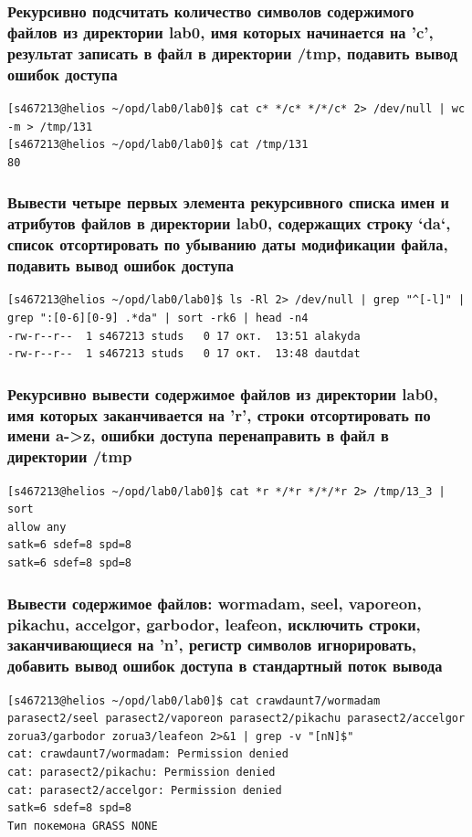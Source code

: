 \subsubsection*{Рекурсивно подсчитать количество символов содержимого файлов из директории lab0, имя которых начинается на 'c', результат записать в файл в директории /tmp, подавить вывод ошибок доступа}
\begin{verbatim}
[s467213@helios ~/opd/lab0/lab0]$ cat c* */c* */*/c* 2> /dev/null | wc -m > /tmp/131
[s467213@helios ~/opd/lab0/lab0]$ cat /tmp/131
80
\end{verbatim}


\subsubsection*{Вывести четыре первых элемента рекурсивного списка имен и атрибутов файлов в директории lab0, содержащих строку `da`, список отсортировать по убыванию даты модификации файла, подавить вывод ошибок доступа}
\begin{verbatim}
[s467213@helios ~/opd/lab0/lab0]$ ls -Rl 2> /dev/null | grep "^[-l]" | grep ":[0-6][0-9] .*da" | sort -rk6 | head -n4
-rw-r--r--  1 s467213 studs   0 17 окт.  13:51 alakyda
-rw-r--r--  1 s467213 studs   0 17 окт.  13:48 dautdat
\end{verbatim}

\subsubsection*{Рекурсивно вывести содержимое файлов из директории lab0, имя которых заканчивается на 'r', строки отсортировать по имени a->z, ошибки доступа перенаправить в файл в директории /tmp}
\begin{verbatim}
[s467213@helios ~/opd/lab0/lab0]$ cat *r */*r */*/*r 2> /tmp/13_3 | sort
allow any
satk=6 sdef=8 spd=8
satk=6 sdef=8 spd=8
\end{verbatim}

\subsubsection*{Вывести содержимое файлов: wormadam, seel, vaporeon, pikachu, accelgor, garbodor, leafeon, исключить строки, заканчивающиеся на 'n', регистр символов игнорировать, добавить вывод ошибок доступа в стандартный поток вывода}
\begin{verbatim}
[s467213@helios ~/opd/lab0/lab0]$ cat crawdaunt7/wormadam parasect2/seel parasect2/vaporeon parasect2/pikachu parasect2/accelgor zorua3/garbodor zorua3/leafeon 2>&1 | grep -v "[nN]$"
cat: crawdaunt7/wormadam: Permission denied
cat: parasect2/pikachu: Permission denied
cat: parasect2/accelgor: Permission denied
satk=6 sdef=8 spd=8
Тип покемона GRASS NONE
\end{verbatim}


